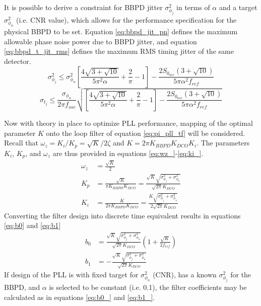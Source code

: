 			It is possible to derive a constraint for BBPD jitter $\sigma^2_{\phi_j}$ in terms of $\alpha$ and a target $\sigma^2_{\phi_n}$ (i.e. CNR value), which allows for the performance specification for the physical BBPD to be set. Equation \ref{eq:bbpd_jit_pn} defines the maximum allowable phase noise power due to BBPD jitter, and equation \ref{eq:bbpd_t_jit_rms} defines the maximum RMS timing jitter of the same detector. 
			\begin{equation}\label{eq:bbpd_jit_pn}
				\sigma^2_{\phi_j} \leq \sigma^2_{\phi_n}\left[\frac{4\sqrt{3+\sqrt{10}}}{5\pi^2\alpha} +\frac{2}{\pi} - 1 \right] - \frac{2S_{0_{osc}}(3 + \sqrt{10})}{5\pi\alpha^2f_{ref}}
			\end{equation}
			\begin{equation}\label{eq:bbpd_t_jit_rms}
				\sigma_{t_j} \leq \frac{\sigma_{\phi_n}}{2\pi f_{osc}}\sqrt{\left[\frac{4\sqrt{3+\sqrt{10}}}{5\pi^2\alpha} +\frac{2}{\pi} - 1 \right] - \frac{2S_{0_{osc}}(3 + \sqrt{10})}{5\pi\alpha^2f_{ref}}}
			\end{equation}

			Now with theory in place to optimize PLL performance, mapping of the optimal parameter $K$ onto the loop filter of equation \ref{eq:pi_pll_tf} will be considered. Recall that $\omega_z = K_i/K_p = \sqrt{K}/2\zeta$ and $K = 2\pi K_{BBPD}K_{DCO}K_{i}$. The parameters $K_i$, $K_p$, and $\omega_z$ are thus provided in equations \ref{eq:wz_}-\ref{eq:ki_}.
			\begin{align}
				\omega_z &= \frac{\sqrt{K}}{2}\label{eq:wz_}\\
				K_p &= \frac{\sqrt{K}}{\pi K_{BBPD}K_{DCO}} = \frac{\sqrt{K}\sqrt{\sigma^2_{\phi_j} + \sigma^2_{\phi_n}}}{\sqrt{2\pi}K_{DCO}}\\
				K_i &= \frac{K}{2\pi K_{BBPD}K_{DCO}} = \frac{K\sqrt{\sigma^2_{\phi_j} + \sigma^2_{\phi_n}}}{2\sqrt{2\pi}K_{DCO}}\label{eq:ki_}
			\end{align}
			Converting the filter design into discrete time equivalent results in equations \ref{eq:b0} and \ref{eq:b1}
			\begin{align}
				b_0 &= \frac{\sqrt{K}\sqrt{\sigma^2_{\phi_j} + \sigma^2_{\phi_n}}}{\sqrt{2\pi}K_{DCO}}\left(1+\frac{\sqrt{K}}{2f_{ref}}\right)\label{eq:b0}\\
				 b_1 &=  - \frac{\sqrt{K}\sqrt{\sigma^2_{\phi_j} + \sigma^2_{\phi_n}}}{\sqrt{2\pi}K_{DCO}}\label{eq:b1}
			\end{align}
			If design of the PLL is with fixed target for $\sigma^2_{\phi_n}$ (CNR), has a known $\sigma^2_{\phi_j}$ for the BBPD, and $\alpha$ is selected to be constant (i.e. 0.1), the filter coefficients may be calculated as in equations \ref{eq:b0_} and \ref{eq:b1_}.

